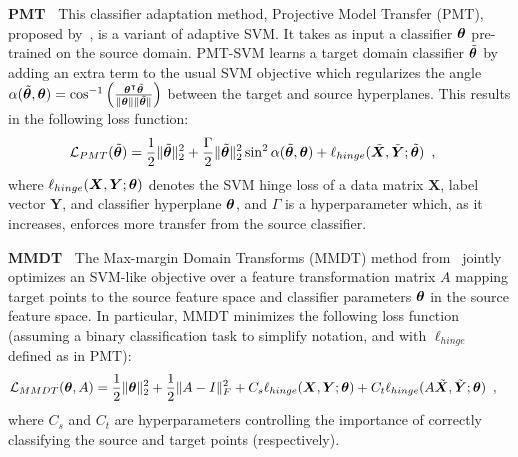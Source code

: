 {\bf PMT~\cite{aytar-iccv11}} 
This classifier adaptation method, Projective Model Transfer (PMT), proposed by~\cite{aytar-iccv11}, is a variant of adaptive SVM. It takes as input a classifier $\bm{\theta}$ pre-trained on the source domain.
PMT-SVM learns a target domain classifier $\tilde{\bm{\theta}}$ by adding an extra term to the usual SVM objective which regularizes the angle
$
\alpha(\tilde{\bm{\theta}}, \bm{\theta}) =
\cos^{-1}\left(
  \frac{
    \bm{\theta}^{\intercal} \tilde{\bm{\theta}}
  }{
    \| \bm{\theta} \| \| \tilde{\bm{\theta}} \|
  }
\right)
$
between the target and source hyperplanes.
This results in the following loss function:
\begin{align}
\mathcal{L}_{PMT}(\tilde{\bm{\theta}})
&=
\frac{1}{2} \| \tilde{\bm{\theta}} \|^2_2
+
\frac{\Gamma}{2} \| \tilde{\bm{\theta}} \|^2_2 \sin^2 \alpha(\tilde{\bm{\theta}}, \bm{\theta})
+
\ell_{hinge}(\tilde{\bm{X}}, \tilde{\bm{Y}}; \tilde{\bm{\theta}})
\enspace,
\end{align}
where
$
\ell_{hinge}(\bm{X}, \bm{Y}; \bm{\theta})
$
denotes the SVM hinge loss of a data matrix
$\bm{X}$,
label vector
$\bm{Y}$,
and classifier hyperplane $\bm{\theta}$,
and $\Gamma$ is a hyperparameter which, as it increases, enforces more transfer from the source classifier.

{\bf MMDT~\cite{hoffman-iclr13}}
\newcommand{\mat}[1]{#1}
\newcommand\datransform{\mat{A}}
The Max-margin Domain Transforms (MMDT) method from~\cite{hoffman-iclr13} jointly optimizes an SVM-like objective over a feature transformation matrix $\datransform$ mapping target points to the source feature space and classifier parameters $\bm{\theta}$ in the source feature space.
In particular, MMDT minimizes the following loss function (assuming a binary classification task to simplify notation, and with
$\ell_{hinge}$
defined as in PMT):
\begin{align}
\mathcal{L}_{MMDT}(\svmT, \datransform)
&=
\frac{1}{2} \| \svmT \|^2_2
+
\frac{1}{2} \| \datransform - \mat{I} \|^2_F
+
C_s
\ell_{hinge}(\bm{X}, \bm{Y}; \svmT)
+
C_t
\ell_{hinge}(\datransform \tilde{\bm{X}}, \tilde{\bm{Y}}; \svmT)
\enspace,
\end{align}
where $C_s$ and $C_t$ are hyperparameters controlling the importance of correctly classifying the source and target points (respectively).



